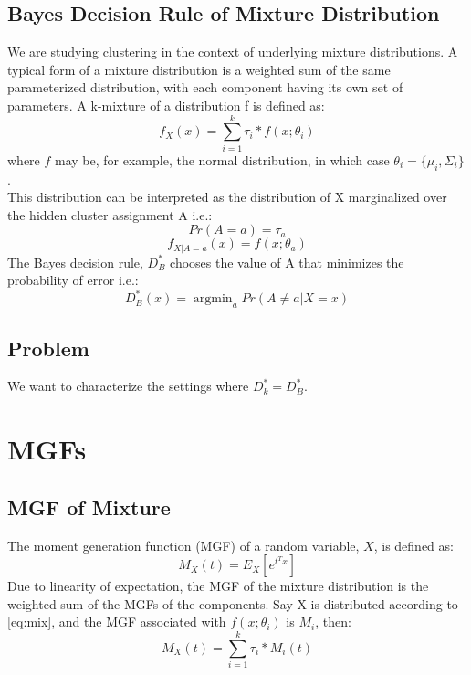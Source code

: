 \documentclass{article}
\DeclareMathOperator*{\argmin}{argmin}
\begin{document}
\subsection {Bayes Decision Rule of Mixture Distribution}
\quad We are studying clustering in the context of underlying mixture distributions. A typical form of a mixture distribution is a weighted sum of the same parameterized distribution, with each component having its own set of parameters. A k-mixture of a distribution f is defined as:
\begin{equation}
\label{eq:mix}
f_X(x) = \sum\limits_{i=1}^k \tau_i * f(x;\theta_i)
\end{equation}
where $f$ may be, for example, the normal distribution, in which case $\theta_i = \{\mu_i,\Sigma_i\}$. \\
\null \quad This distribution can be interpreted as the distribution of X marginalized over the hidden cluster assignment A i.e.:
\[
Pr(A=a) = \tau_a
\]
\[
f_{X|A=a}(x) = f(x;\theta_a)
\]
\null \quad The Bayes decision rule, $D_B^*$ chooses the value of A that minimizes the probability of error i.e.:
\[ D_B^*(x) = \argmin_a Pr(A \neq a | X=x) \]

\subsection{Problem}
\null \quad We want to characterize the settings where $D_k^* = D_B^*$.



\section{MGFs}
\subsection{MGF of Mixture}
\quad The moment generation function (MGF) of a random variable, $X$, is defined as:
\[ M_X(t) = E_X[e^{t^Tx}]\]
\quad Due to linearity of expectation, the MGF of the mixture distribution is the weighted sum of the MGFs of the components. Say X is distributed according to \ref{eq:mix}, and the MGF associated with $f(x;\theta_i)$ is $M_i$, then:
\begin{equation}
\label{eq:mgfmix}
M_X(t) = \sum\limits_{i=1}^k \tau_i * M_i(t)
\end{equation}
\end{document}
